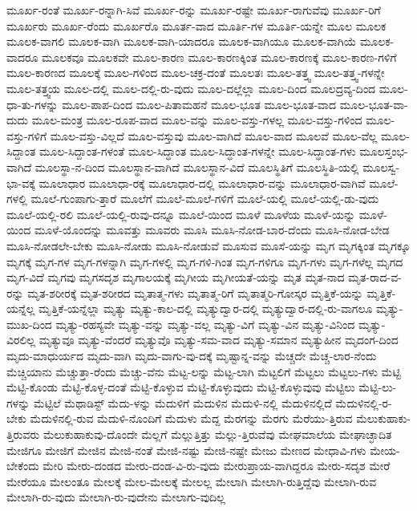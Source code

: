 {ಮೂರ್ಖ-ರಂತೆ
ಮೂರ್ಖ-ರನ್ನಾಗಿ-ಸಿವೆ
ಮೂರ್ಖ-ರನ್ನು
ಮೂರ್ಖ-ರಷ್ಟೇ
ಮೂರ್ಖ-ರಾಗುವೆವು
ಮೂರ್ಖ-ರಿಗೆ
ಮೂರ್ಖರು
ಮೂರ್ಖ-ರೆಂದು
ಮೂರ್ಖರೊ
ಮೂರ್ತ-ವಾದ
ಮೂರ್ತಿ-ಗಳ
ಮೂರ್ತಿ-ಯನ್ನೇ
ಮೂಲ
ಮೂಲಕ
ಮೂಲಕ-ವಾಗಲಿ
ಮೂಲಕ-ವಾಗಿ
ಮೂಲಕ-ವಾಗಿ-ಯಾದರೂ
ಮೂಲಕ-ವಾಗಿಯೂ
ಮೂಲಕ-ವಾಗಿಯೆ
ಮೂಲಕ-ವಾದರೂ
ಮೂಲಕವೂ
ಮೂಲಕವೇ
ಮೂಲ-ಕಾರಣ
ಮೂಲ-ಕಾರಣಕ್ಕಿಂತ
ಮೂಲ-ಕಾರಣಕ್ಕೆ
ಮೂಲ-ಕಾರಣ-ಗಳಿಗೆ
ಮೂಲ-ಕಾರಣದ
ಮೂಲಕ್ಕೆ
ಮೂಲ-ಗಳಿಂದ
ಮೂಲ-ಚಕ್ರ-ದಂತೆ
ಮೂಲತಃ
ಮೂಲ-ತತ್ತ್ವ
ಮೂಲ-ತತ್ತ್ವ-ಗಳನ್ನೇ
ಮೂಲ-ತತ್ತ್ವಯ
ಮೂಲ-ದಲ್ಲಿ
ಮೂಲ-ದಲ್ಲಿ-ರು-ವುದು
ಮೂಲ-ದಲ್ಲೆಲ್ಲಾ
ಮೂಲ-ದಿಂದ
ಮೂಲದ್ರವ್ಯ-ದಿಂದ
ಮೂಲ-ಧಾ-ತು-ಗಳನ್ನು
ಮೂಲ-ಪಾಪ-ದಿಂದ
ಮೂಲ-ಪಿತಾಮಹನೆ
ಮೂಲ-ಭೂತ
ಮೂಲ-ಭೂತ-ವಾದ
ಮೂಲ-ಭೂತ-ವಾ-ದುದು
ಮೂಲ-ಮಂತ್ರ
ಮೂಲ-ರೂಪ-ವಾದ
ಮೂಲ-ವನ್ನು
ಮೂಲ-ವಸ್ತು-ಗಳಲ್ಲ
ಮೂಲ-ವಸ್ತು-ಗಳಿಂದ
ಮೂಲ-ವಸ್ತು-ಗಳಿಗೆ
ಮೂಲ-ವಸ್ತು-ವಿಲ್ಲದೆ
ಮೂಲ-ವಸ್ತುವು
ಮೂಲ-ವಾಗಿದೆ
ಮೂಲ-ವಾದ
ಮೂಲವೆ
ಮೂಲ-ವೆಲ್ಲ
ಮೂಲ-ಸಿದ್ದಾಂತ
ಮೂಲ-ಸಿದ್ದಾಂತ-ಗಳಂತೆ
ಮೂಲ-ಸಿದ್ಧಾಂತ
ಮೂಲ-ಸಿದ್ಧಾಂತ-ಗಳನ್ನೇ
ಮೂಲ-ಸಿದ್ಧಾಂತ-ಗಳು
ಮೂಲಸ್ತಂಭ-ವಾಗಿದೆ
ಮೂಲಸ್ಥಾ-ನ-ದಿಂದ
ಮೂಲಸ್ಥಾನ-ವಾಗಿದೆ
ಮೂಲಸ್ಥಾನ-ವಿದೆ
ಮೂಲಸ್ಥಿತಿಗೆ
ಮೂಲಸ್ಥಿತಿ-ಯಲ್ಲಿ
ಮೂಲಸ್ವ-ಭಾ-ವಕ್ಕೆ
ಮೂಲಾಧಾರ
ಮೂಲಾಧಾ-ರಕ್ಕೆ
ಮೂಲಾಧಾರ-ದಲ್ಲಿ
ಮೂಲಾಧಾರ-ವನ್ನು
ಮೂಲಾಧಾರ-ವಾಗಿವೆ
ಮೂಲೆ-ಗಳಲ್ಲಿ
ಮೂಲೆ-ಗುಂಪಾಗು-ತ್ತಾರೆ
ಮೂಲೆಗೆ
ಮೂಲೆ-ಮೂಲೆ-ಗಳಿಗೆ
ಮೂಲೆ-ಯಲ್ಲಿ
ಮೂಲೆ-ಯಲ್ಲಿ-ಡು-ವುದು
ಮೂಲೆ-ಯಲ್ಲಿ-ರಲಿ
ಮೂಲೆ-ಯಲ್ಲಿ-ರುವು-ದನ್ನೂ
ಮೂಲೆ-ಯಿಂದ
ಮೂಳೆ
ಮೂಳೆಯ
ಮೂಳೆ-ಯನ್ನು
ಮೂಳೆ-ಯಿಂದ
ಮೂಳೆ-ಯೊಂದನ್ನು
ಮೂವತ್ತು
ಮೂವರು
ಮೂಸಿ
ಮೂಸಿ-ನೋಡ-ಬಾರ-ದೆಂದು
ಮೂಸಿ-ನೋಡ-ಬೇಡ
ಮೂಸಿ-ನೋಡಲೇ-ಬೇಕು
ಮೂಸಿ-ನೋಡು
ಮೂಸಿ-ನೋಡುವೆ
ಮೂಸುವ
ಮೂಸೆ-ಯನ್ನು
ಮೃಗ
ಮೃಗಕ್ಕಿಂತ
ಮೃಗಕ್ಕೂ
ಮೃಗಕ್ಕೆ
ಮೃಗ-ಗಳ
ಮೃಗ-ಗಳನ್ನಾಗಿ
ಮೃಗ-ಗಳಲ್ಲಿ
ಮೃಗ-ಗಳಿ-ಗಿಂತ
ಮೃಗ-ಗಳಿಗೂ
ಮೃಗ-ಗಳು
ಮೃಗ-ಗಳೆಲ್ಲ
ಮೃಗದ
ಮೃಗ-ವಿದೆ
ಮೃಗವು
ಮೃಗಸದೃಶ
ಮೃಗಾಲಯಕ್ಕೆ
ಮೃಗೀಯ
ಮೃಗೀಯತೆ-ಯನ್ನು
ಮೃತ
ಮೃತ-ನಾದ
ಮೃತ-ರಾದ-ವ-ರನ್ನು
ಮೃತ-ಶರೀರಕ್ಕೆ
ಮೃತ-ಶರೀರದ
ಮೃತಾತ್ಮ-ಗಳು
ಮೃತಾತ್ಮ-ರಿಗೆ
ಮೃತಾತ್ಮರಿ-ಗೋಸ್ಕರ
ಮೃತ್ತಿಕೆ-ಯನ್ನು
ಮೃತ್ತಿಕೆ-ಯನ್ನೆಲ್ಲ
ಮೃತ್ತಿಕೆ-ಯನ್ನೆಲ್ಲಾ
ಮೃತ್ಯು
ಮೃತ್ಯು-ಕಾಲ-ದಲ್ಲಿ
ಮೃತ್ಯುದ್ವಾರ-ದಲ್ಲಿ
ಮೃತ್ಯುದ್ವಾರ-ದಲ್ಲಿ-ರು-ವಾಗಲೂ
ಮೃತ್ಯು-ಮುಖ-ದಿಂದ
ಮೃತ್ಯು-ರಹಸ್ಯವೇ
ಮೃತ್ಯು-ವನ್ನು
ಮೃತ್ಯು-ವಲ್ಲ
ಮೃತ್ಯು-ವಿಗೆ
ಮೃತ್ಯು-ವಿನ
ಮೃತ್ಯು-ವಿನಿಂದ
ಮೃತ್ಯು-ವಿರಲಿಲ್ಲ
ಮೃತ್ಯುವೂ
ಮೃತ್ಯು-ವೆಂದರೆ
ಮೃತ್ಯುವೊ
ಮೃತ್ಯು-ಸಮ-ವಾದ
ಮೃತ್ಯು-ಸಮಾನ
ಮೃತ್ಯುಹೀನ
ಮೃದಂಗ-ದಿಂದ
ಮೃದು-ಮಾಧುರ್ಯದ
ಮೃದು-ವಾಗಿ
ಮೃದು-ವಾಗು-ವು-ದಕ್ಕೆ
ಮೃಷ್ಟಾನ್ನ-ವನ್ನು
ಮೆಚ್ಚದೇ
ಮೆಚ್ಚ-ಲಾರ-ನೆಂದು
ಮೆಚ್ಚಿಯಾನು
ಮೆಚ್ಚುತ್ತಾ-ರೆಂದು
ಮೆಚ್ಚು-ವೆನು
ಮೆಟ್ಟ-ಲನ್ನು
ಮೆಟ್ಟ-ಲಾಗಿ
ಮೆಟ್ಟಲಿಗೆ
ಮೆಟ್ಟಲು
ಮೆಟ್ಟಲು-ಗಳು
ಮೆಟ್ಟಿ
ಮೆಟ್ಟಿ-ಕೊಂಡು
ಮೆಟ್ಟಿ-ಕೊಳ್ಳ-ದಂತೆ
ಮೆಟ್ಟಿ-ಕೊಳ್ಳುವ
ಮೆಟ್ಟಿ-ಕೊಳ್ಳುವುದು
ಮೆಟ್ಟಿ-ಕೊಳ್ಳುವುವು
ಮೆಟ್ಟಿಲು
ಮೆಟ್ಟಿ-ಲು-ಗಳನ್ನು
ಮೆಟ್ಟಿಲೆ
ಮೆಥಾಡಿಸ್ಟ್
ಮೆದು-ಳನ್ನು
ಮೆದುಳಿಗೆ
ಮೆದುಳಿನ
ಮೆದುಳಿ-ನಲ್ಲಿ
ಮೆದುಳಿನಲ್ಲಿದೆ
ಮೆದುಳಿನಲ್ಲಿ-ರ-ಬೇಕು
ಮೆದುಳಿನಲ್ಲಿ-ರುವ
ಮೆದುಳಿ-ನೊಂದಿಗೆ
ಮೆದುಳು
ಮೆದ್ದ
ಮೆರಗನ್ನು
ಮೆರಗು
ಮೆರೆಯು-ತ್ತಿರುವ
ಮೆಲುಕುಹಾಕು-ತ್ತಿರುವರು
ಮೆಲುಕುಹಾಕುವು-ದೊಂದೇ
ಮೆಲ್ಲಗೆ
ಮೆಲ್ಲುತ್ತಿತ್ತು
ಮೆಲ್ಲು-ತ್ತಿರುವೆವು
ಮೇಘಮಾಲೆಯ
ಮೇಘಾಚ್ಛಾದಿತ
ಮೇಜಿಗೂ
ಮೇಜಿಗೆ
ಮೇಜಿನ
ಮೇಜಿ-ನಂತೆ
ಮೇಜಿ-ನಷ್ಟು
ಮೇಜಿ-ನಷ್ಟೇ
ಮೇಜು
ಮೇಣದ
ಮೇಧಾವಿ-ಗಳು
ಮೇಯ-ಬೇಕೆಂದು
ಮೇರಿ
ಮೇರು-ದಂಡದ
ಮೇರು-ದಂಡ-ವಿ-ರು-ವುದು
ಮೇರುಪ್ರಾಯ-ವಾಗಿದ್ದರೂ
ಮೇರು-ಸದೃಶ
ಮೇರೆ
ಮೇರೆಯೂ
ಮೇಲಂತೂ
ಮೇಲಕ್ಕೆ
ಮೇಲ-ಮೇಲಕ್ಕೆ
ಮೇಲಲ್ಲ
ಮೇಲಾಗಿ
ಮೇಲಾಗಿ-ರುತ್ತಿದ್ದೆವು
ಮೇಲಾಗಿ-ರುವ
ಮೇಲಾಗಿ-ರು-ವುದು
ಮೇಲಾಗಿ-ರು-ವುದೇನು
ಮೇಲಾಗು-ವುದಿಲ್ಲ
}
